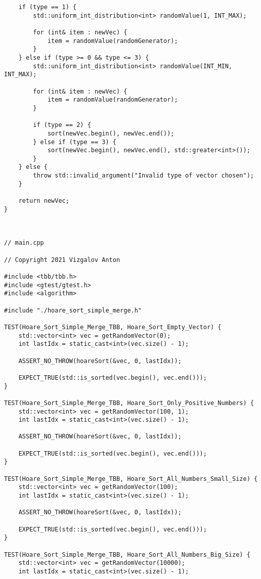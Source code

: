 \documentclass{report}
\begin{document}
\begin{lstlisting}
    if (type == 1) {
        std::uniform_int_distribution<int> randomValue(1, INT_MAX);

        for (int& item : newVec) {
            item = randomValue(randomGenerator);
        }
    } else if (type >= 0 && type <= 3) {
        std::uniform_int_distribution<int> randomValue(INT_MIN, INT_MAX);

        for (int& item : newVec) {
            item = randomValue(randomGenerator);
        }

        if (type == 2) {
            sort(newVec.begin(), newVec.end());
        } else if (type == 3) {
            sort(newVec.begin(), newVec.end(), std::greater<int>());
        }
    } else {
        throw std::invalid_argument("Invalid type of vector chosen");
    }

    return newVec;
}



// main.cpp

// Copyright 2021 Vizgalov Anton

#include <tbb/tbb.h>
#include <gtest/gtest.h>
#include <algorithm>

#include "./hoare_sort_simple_merge.h"

TEST(Hoare_Sort_Simple_Merge_TBB, Hoare_Sort_Empty_Vector) {
    std::vector<int> vec = getRandomVector(0);
    int lastIdx = static_cast<int>(vec.size() - 1);

    ASSERT_NO_THROW(hoareSort(&vec, 0, lastIdx));

    EXPECT_TRUE(std::is_sorted(vec.begin(), vec.end()));
}

TEST(Hoare_Sort_Simple_Merge_TBB, Hoare_Sort_Only_Positive_Numbers) {
    std::vector<int> vec = getRandomVector(100, 1);
    int lastIdx = static_cast<int>(vec.size() - 1);

    ASSERT_NO_THROW(hoareSort(&vec, 0, lastIdx));

    EXPECT_TRUE(std::is_sorted(vec.begin(), vec.end()));
}

TEST(Hoare_Sort_Simple_Merge_TBB, Hoare_Sort_All_Numbers_Small_Size) {
    std::vector<int> vec = getRandomVector(100);
    int lastIdx = static_cast<int>(vec.size() - 1);

    ASSERT_NO_THROW(hoareSort(&vec, 0, lastIdx));

    EXPECT_TRUE(std::is_sorted(vec.begin(), vec.end()));
}

TEST(Hoare_Sort_Simple_Merge_TBB, Hoare_Sort_All_Numbers_Big_Size) {
    std::vector<int> vec = getRandomVector(10000);
    int lastIdx = static_cast<int>(vec.size() - 1);


\end{lstlisting}
\end{document}
